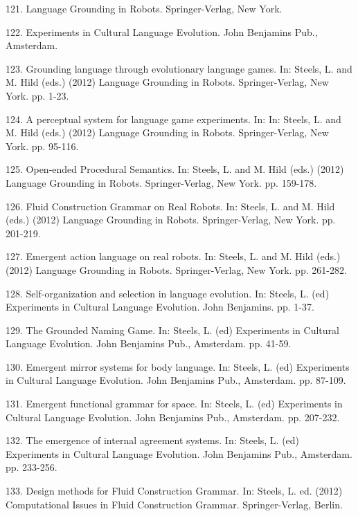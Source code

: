 121. \citet{Steels:12d} Language Grounding in Robots. Springer-Verlag, New York. 

122. \citet{Steels:12e} Experiments in Cultural Language Evolution. John Benjamins Pub., Amsterdam. 
 
123. \citet{Steels:12f} Grounding language through evolutionary language games. In: Steels, L. and M. Hild (eds.) (2012) Language Grounding in Robots. Springer-Verlag, New York. pp. 1-23.

124. \citet{Spranger:12g} A perceptual system for language game experiments. In: In: Steels, L. and M. Hild (eds.) (2012) Language Grounding in Robots. Springer-Verlag, New York. pp. 95-116. 

125. \citet{Spranger:12h} Open-ended Procedural Semantics. In: Steels, L. and M. Hild (eds.) (2012) Language Grounding in Robots. Springer-Verlag, New York. pp. 159-178. 

126. \citet{Steels:12i} Fluid Construction Grammar on Real Robots. In: Steels, L. and M. Hild (eds.) (2012) Language Grounding in Robots. Springer-Verlag, New York. pp. 201-219. 

127. \citet{Steels:12j} Emergent action language on real robots. In: Steels, L. and M. Hild (eds.) (2012) Language Grounding in Robots. Springer-Verlag, New York. pp. 261-282. 

128. \citet{Steels:12k} Self-organization and selection in language evolution. In: Steels, L. (ed) Experiments in Cultural Language Evolution. John Benjamins. pp. 1-37. 

129. \citet{Steels:12l} The Grounded Naming Game. In: Steels, L. (ed) Experiments in Cultural Language Evolution. John Benjamins Pub., Amsterdam. pp. 41-59. 

130. \citet{Steels:12m} Emergent mirror systems for body language. In: Steels, L. (ed) Experiments in Cultural Language Evolution. John Benjamins Pub., Amsterdam. pp. 87-109. 

131. \citet{spranger:12n} Emergent functional grammar for space. In: Steels, L. (ed) Experiments in Cultural Language Evolution. John Benjamins Pub., Amsterdam. pp. 207-232. 

132. \citet{beuls:12o} The emergence of internal agreement systems. In: Steels, L. (ed) Experiments in Cultural Language Evolution. John Benjamins Pub., Amsterdam. pp. 233-256. 

133. \citet{Steels:12p}  Design methods for Fluid Construction Grammar. In: Steels, L. ed. (2012) Computational Issues in Fluid Construction Grammar. Springer-Verlag, Berlin.  

